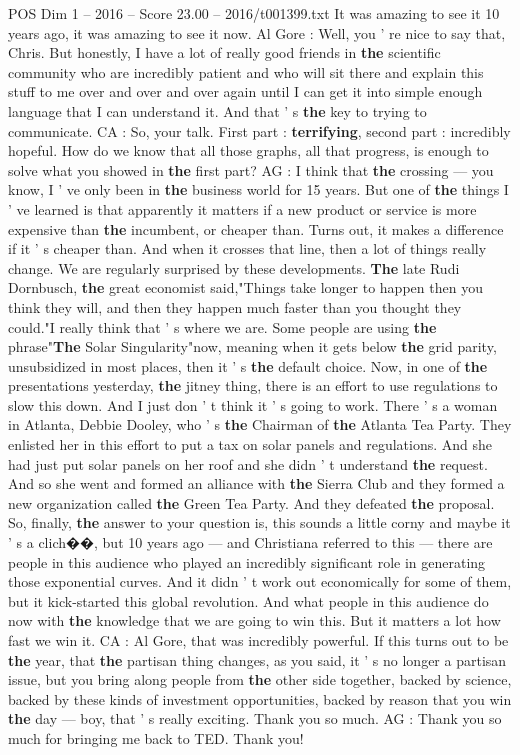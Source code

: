 \begin{textsample}{POS Dim 1 – 2016 – Score 23.00 – 2016/t001399.txt}
It was amazing to see it 10 years ago, it was amazing to see it now.
Al Gore : Well, you ' re nice to say that, Chris.
But honestly, I have a lot of really good friends in \textbf{the} scientific community who are incredibly patient and who will sit there and explain this stuff to me over and over and over again until I can get it into simple enough language that I can understand it.
And that ' s \textbf{the} key to trying to communicate.
CA : So, your talk.
First part : \textbf{terrifying}, second part : incredibly hopeful.
How do we know that all those graphs, all that progress, is enough to solve what you showed in \textbf{the} first part?
AG : I think that \textbf{the} crossing — you know, I ' ve only been in \textbf{the} business world for 15 years.
But one of \textbf{the} things I ' ve learned is that apparently it matters if a new product or service is more expensive than \textbf{the} incumbent, or cheaper than.
Turns out, it makes a difference if it ' s cheaper than.
And when it crosses that line, then a lot of things really change.
We are regularly surprised by these developments. \textbf{The} late Rudi Dornbusch, \textbf{the} great economist said,"Things take longer to happen then you think they will, and then they happen much faster than you thought they could."I really think that ' s where we are.
Some people are using \textbf{the} phrase"\textbf{The} Solar Singularity"now, meaning when it gets below \textbf{the} grid parity, unsubsidized in most places, then it ' s \textbf{the} default choice.
Now, in one of \textbf{the} presentations yesterday, \textbf{the} jitney thing, there is an effort to use regulations to slow this down.
And I just don ' t think it ' s going to work.
There ' s a woman in Atlanta, Debbie Dooley, who ' s \textbf{the} Chairman of \textbf{the} Atlanta Tea Party.
They enlisted her in this effort to put a tax on solar panels and regulations.
And she had just put solar panels on her roof and she didn ' t understand \textbf{the} request.
And so she went and formed an alliance with \textbf{the} Sierra Club and they formed a new organization called \textbf{the} Green Tea Party.
And they defeated \textbf{the} proposal.
So, finally, \textbf{the} answer to your question is, this sounds a little corny and maybe it ' s a clich{\EmojiFont �}{\EmojiFont �}, but 10 years ago — and Christiana referred to this — there are people in this audience who played an incredibly significant role in generating those exponential curves.
And it didn ' t work out economically for some of them, but it kick-started this global revolution.
And what people in this audience do now with \textbf{the} knowledge that we are going to win this.
But it matters a lot how fast we win it.
CA : Al Gore, that was incredibly powerful.
If this turns out to be \textbf{the} year, that \textbf{the} partisan thing changes, as you said, it ' s no longer a partisan issue, but you bring along people from \textbf{the} other side together, backed by science, backed by these kinds of investment opportunities, backed by reason that you win \textbf{the} day — boy, that ' s really exciting.
Thank you so much.
AG : Thank you so much for bringing me back to TED.
Thank you!


\end{textsample}
